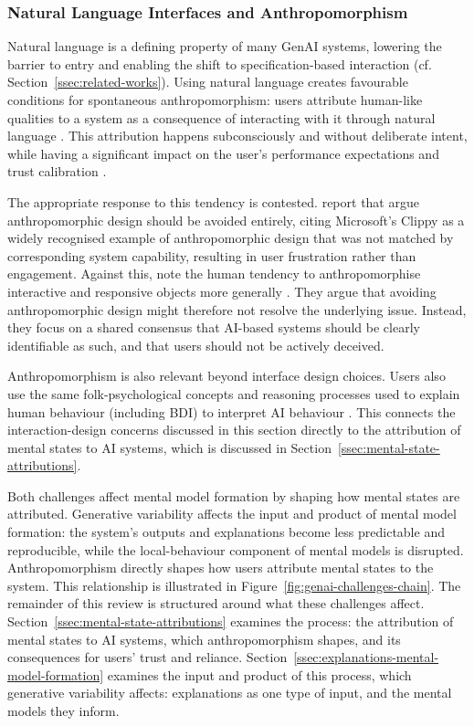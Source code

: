\subsubsection*{Natural Language Interfaces and Anthropomorphism}

Natural language is a defining property of many \ac{GenAI} systems, lowering the barrier to entry and enabling the shift to specification-based interaction (cf. Section~\ref{ssec:related-works}). Using natural language creates favourable conditions for spontaneous anthropomorphism: users attribute human-like qualities to a system as a consequence of interacting with it through natural language \parencite{Weisz2025}. This attribution happens subconsciously and without deliberate intent, while having a significant impact on the user's performance expectations and trust calibration \parencite{Weisz2025}.

The appropriate response to this tendency is contested. \textcite{Weisz2025} report that \textcite{Shneiderman2023} argue anthropomorphic design should be avoided entirely, citing Microsoft's Clippy as a widely recognised example of anthropomorphic design that was not matched by corresponding system capability, resulting in user frustration rather than engagement. Against this, \textcite{Weisz2025} note the human tendency to anthropomorphise interactive and responsive objects more generally \parencite{Muller2004}. They argue that avoiding anthropomorphic design might therefore not resolve the underlying issue. Instead, they focus on a shared consensus that \ac{AI}-based systems should be clearly identifiable as such, and that users should not be actively deceived.

Anthropomorphism is also relevant beyond interface design choices. Users also use the same folk-psychological concepts and reasoning processes used to explain human behaviour (including BDI) to interpret \ac{AI} behaviour \parencite{Miller2019}. This connects the interaction-design concerns discussed in this section directly to the attribution of mental states to \ac{AI} systems, which is discussed in Section~\ref{ssec:mental-state-attributions}.

Both challenges affect mental model formation by shaping how mental states are attributed. Generative variability affects the input and product of mental model formation: the system's outputs and explanations become less predictable and reproducible, while the local-behaviour component of mental models is disrupted. Anthropomorphism directly shapes how users attribute mental states to the system. This relationship is illustrated in Figure~\ref{fig:genai-challenges-chain}. The remainder of this review is structured around what these challenges affect. Section~\ref{ssec:mental-state-attributions} examines the process: the attribution of mental states to \ac{AI} systems, which anthropomorphism shapes, and its consequences for users' trust and reliance. Section~\ref{ssec:explanations-mental-model-formation} examines the input and product of this process, which generative variability affects: explanations as one type of input, and the mental models they inform.

